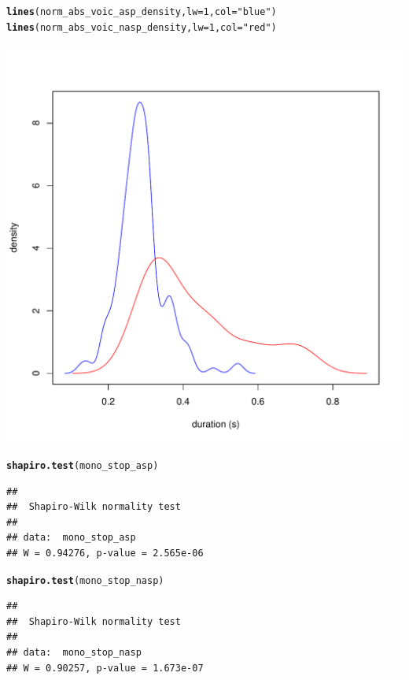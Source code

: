 \documentclass[a4paper,11pt]{article}\usepackage[]{graphicx}\usepackage[]{color}
\makeatletter
\def\maxwidth{ %
  \ifdim\Gin@nat@width>\linewidth
    \linewidth
  \else
    \Gin@nat@width
  \fi
}
\newcommand{\hlnum}[1]{\textcolor[rgb]{0.686,0.059,0.569}{#1}}%
\newcommand{\hlstr}[1]{\textcolor[rgb]{0.192,0.494,0.8}{#1}}%
\newcommand{\hlstd}[1]{\textcolor[rgb]{0.345,0.345,0.345}{#1}}%
\newcommand{\hlkwc}[1]{\textcolor[rgb]{0.333,0.667,0.333}{#1}}%
\newcommand{\hlkwd}[1]{\textcolor[rgb]{0.737,0.353,0.396}{\textbf{#1}}}%
\newenvironment{kframe}{%
 \def\at@end@of@kframe{}%
 \ifinner\ifhmode%
  \def\at@end@of@kframe{\end{minipage}}%
  \begin{minipage}{\columnwidth}%
 \fi\fi%
 \def\FrameCommand##1{\hskip\@totalleftmargin \hskip-\fboxsep
 \colorbox{shadecolor}{##1}\hskip-\fboxsep
     \hskip-\linewidth \hskip-\@totalleftmargin \hskip\columnwidth}%
 \MakeFramed {\advance\hsize-\width
   \@totalleftmargin\z@ \linewidth\hsize
   \@setminipage}}%
 {\par\unskip\endMakeFramed%
 \at@end@of@kframe}
\newenvironment{knitrout}{}{} %
\makeatother
\begin{document}
\begin{knitrout}
\begin{kframe}
\begin{alltt}
\hlkwd{lines}\hlstd{(norm_abs_voic_asp_density,} \hlkwc{lw} \hlstd{=} \hlnum{1}\hlstd{,} \hlkwc{col} \hlstd{=} \hlstr{"blue"}\hlstd{)}
\hlkwd{lines}\hlstd{(norm_abs_voic_nasp_density,} \hlkwc{lw} \hlstd{=} \hlnum{1}\hlstd{,} \hlkwc{col} \hlstd{=} \hlstr{"red"}\hlstd{)}
\end{alltt}
\end{kframe}
\includegraphics[width=\maxwidth]{img/mono-stop-dens-1} 

\end{knitrout}

\begin{knitrout}
\color{fgcolor}\begin{kframe}
\begin{alltt}
\hlkwd{shapiro.test}\hlstd{(mono_stop_asp)}
\end{alltt}
\begin{verbatim}
## 
## 	Shapiro-Wilk normality test
## 
## data:  mono_stop_asp
## W = 0.94276, p-value = 2.565e-06
\end{verbatim}
\begin{alltt}
\hlkwd{shapiro.test}\hlstd{(mono_stop_nasp)}
\end{alltt}
\begin{verbatim}
## 
## 	Shapiro-Wilk normality test
## 
## data:  mono_stop_nasp
## W = 0.90257, p-value = 1.673e-07
\end{verbatim}
\end{kframe}
\end{knitrout}
\end{document}
